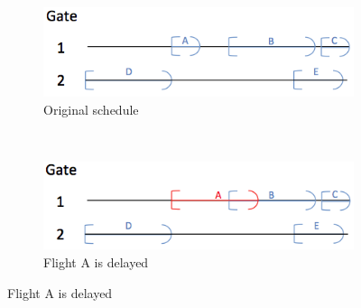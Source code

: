 \documentclass[12pt, a4paper]{report}
\begin{document}
\begin{figure}[h!]
\centering
\begin{subfigure}[b]{0.5\textwidth}
	\centering
	\includegraphics[width=\textwidth]{../figures/options_original.png}
	\caption{Original schedule}
\end{subfigure}~
\begin{subfigure}[b]{0.5\textwidth}
	\centering
	\includegraphics[width=\textwidth]{../figures/options_delay.png}
	\caption{Flight A is delayed}
\end{subfigure}


\end{figure}
\end{document}
